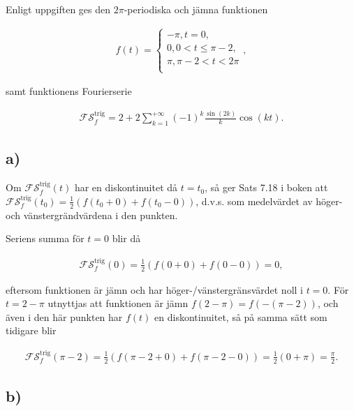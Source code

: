 \documentclass[a4paper]{article}
\begin{document}
Enligt uppgiften ges den $2\pi$-periodiska och jämna funktionen

\begin{align}
  f(t) = 
  \begin{cases}
    -\pi, t = 0,\\
    0, 0 < t \leq \pi - 2,\\
    \pi, \pi - 2 < t < 2\pi\\
  \end{cases},
\end{align}

\noindent samt funktionens Fourierserie

\begin{align}
  \mathcal{FS}_f^{\text{trig}} = 2 + 2\sum_{k=1}^{+\infty}(-1)^k\frac{\sin(2k)}{k}\cos(kt).
\end{align}

\subsection*{a)}

Om $\mathcal{FS}_f^{\text{trig}}(t)$ har en diskontinuitet då $t = t_0$, så ger
Sats 7.18 i boken att $\mathcal{FS}_f^{\text{trig}}(t_0) = \frac{1}{2}\left(
  f(t_0 + 0) + f(t_0 - 0)\right)$, d.v.s. som medelvärdet av höger- och vänstergrändvärdena i den punkten.

Seriens summa för $t = 0$ blir då

\begin{align*}
  \mathcal{FS}_f^{\text{trig}}(0) = \frac{1}{2}\left( f(0 + 0) + f(0 - 0) \right) = 0,
\end{align*}

eftersom funktionen är jämn och har höger-/vänstergränsvärdet noll i $t = 0$.
För $t = 2 - \pi$ utnyttjas att funktionen är jämn $f(2 - \pi) = f(-(\pi - 2))$,
och även i den här punkten har $f(t)$ en diskontinuitet, så på samma sätt som
tidigare blir

\begin{align*}
  \mathcal{FS}_f^{\text{trig}}(\pi - 2) = \frac{1}{2}\left( f(\pi - 2 + 0) + f(\pi - 2 - 0) \right) = \frac{1}{2}(0 + \pi) = \frac{\pi}{2}.
\end{align*}

\subsection*{b)}
\end{document}
